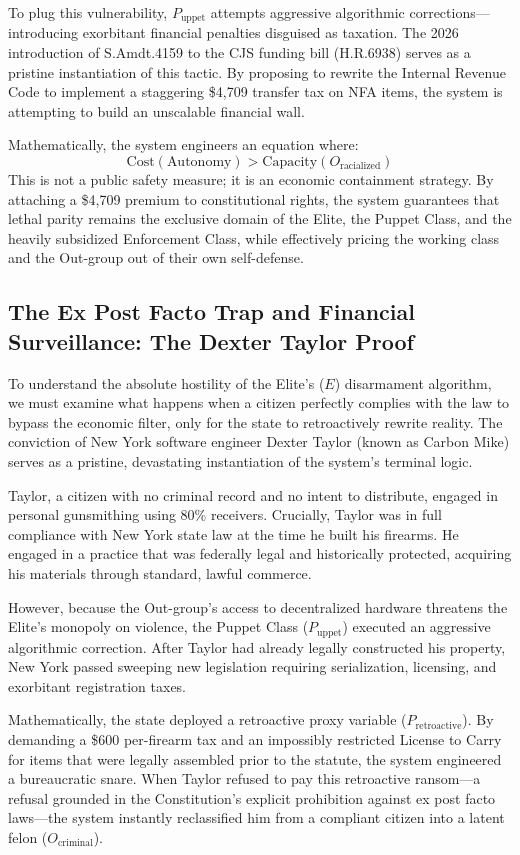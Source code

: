 \documentclass[12pt,openany]{book}
\begin{document}
To plug this vulnerability, $P_{\text{uppet}}$ attempts aggressive algorithmic corrections---introducing exorbitant financial penalties disguised as taxation. The 2026 introduction of S.Amdt.4159 to the CJS funding bill (H.R.6938) serves as a pristine instantiation of this tactic. By proposing to rewrite the Internal Revenue Code to implement a staggering \$4,709 transfer tax on NFA items, the system is attempting to build an unscalable financial wall.

Mathematically, the system engineers an equation where:
\[
\text{Cost}(\text{Autonomy}) > \text{Capacity}(O_{\text{racialized}})
\]
This is not a public safety measure; it is an economic containment strategy. By attaching a \$4,709 premium to constitutional rights, the system guarantees that lethal parity remains the exclusive domain of the Elite, the Puppet Class, and the heavily subsidized Enforcement Class, while effectively pricing the working class and the Out-group out of their own self-defense.

\subsection{The Ex Post Facto Trap and Financial Surveillance: The Dexter Taylor Proof}

To understand the absolute hostility of the Elite's ($E$) disarmament algorithm, we must examine what happens when a citizen perfectly complies with the law to bypass the economic filter, only for the state to retroactively rewrite reality. The conviction of New York software engineer Dexter Taylor (known as Carbon Mike) serves as a pristine, devastating instantiation of the system's terminal logic.

Taylor, a citizen with no criminal record and no intent to distribute, engaged in personal gunsmithing using 80\% receivers. Crucially, Taylor was in full compliance with New York state law at the time he built his firearms. He engaged in a practice that was federally legal and historically protected, acquiring his materials through standard, lawful commerce.

However, because the Out-group's access to decentralized hardware threatens the Elite's monopoly on violence, the Puppet Class ($P_{\text{uppet}}$) executed an aggressive algorithmic correction. After Taylor had already legally constructed his property, New York passed sweeping new legislation requiring serialization, licensing, and exorbitant registration taxes.

Mathematically, the state deployed a retroactive proxy variable ($P_{\text{retroactive}}$). By demanding a \$600 per-firearm tax and an impossibly restricted License to Carry for items that were legally assembled prior to the statute, the system engineered a bureaucratic snare. When Taylor refused to pay this retroactive ransom---a refusal grounded in the Constitution's explicit prohibition against ex post facto laws---the system instantly reclassified him from a compliant citizen into a latent felon ($O_{\text{criminal}}$).
\end{document}
